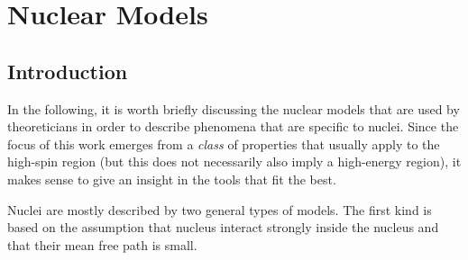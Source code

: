 \chapter{Nuclear Models}

\section{Introduction}

In the following, it is worth briefly discussing the nuclear models that are used by theoreticians in order to describe phenomena that are specific to nuclei. Since the focus of this work emerges from a \emph{class} of properties that usually apply to the high-spin region (but this does not necessarily also imply a high-energy region), it makes sense to give an insight in the tools that fit the best.

Nuclei are mostly described by two general types of models. The first kind is based on the assumption that nucleus interact strongly inside the nucleus and that their mean free path is small.